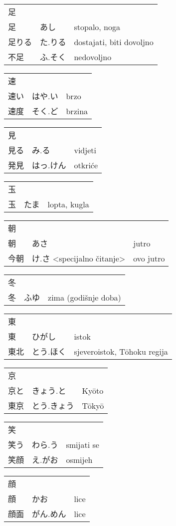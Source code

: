 

\newenvironment{dictentry}[1]{
	\begin{tabular}{p{2cm} p{3cm} p{10cm}}
		#1 &&\\
}{
	\end{tabular}
	\vspace{20pt}
}

\newcommand{\example}[3]{
	\hspace*{\fill}#1 & #2 & #3\\
}

\author{ロボット君}


\begin{dictentry}{足}
\example{足}{あし}{stopalo, noga}
\example{足りる}{た.りる}{dostajati, biti dovoljno}
\example{不足}{ふ.そく}{nedovoljno}
\end{dictentry}

\begin{dictentry}{速}
\example{速い}{はや.い}{brzo}
\example{速度}{そく.ど}{brzina}
\end{dictentry}

\begin{dictentry}{見}
\example{見る}{み.る}{vidjeti}
\example{発見}{はっ.けん}{otkriće}
\end{dictentry}

\begin{dictentry}{玉}
\example{玉}{たま}{lopta, kugla}
\end{dictentry}

\begin{dictentry}{朝}
\example{朝}{あさ}{jutro}
\example{今朝}{け.さ <specijalno čitanje>}{ovo jutro}
\end{dictentry}

\begin{dictentry}{冬}
\example{冬}{ふゆ}{zima (godišnje doba)}
\end{dictentry}

\begin{dictentry}{東}
\example{東}{ひがし}{istok}
\example{東北}{とう.ほく}{sjeveroistok, Tōhoku regija}
\end{dictentry}

\begin{dictentry}{京}
\example{京と}{きょう.と}{Kyōto}
\example{東京}{とう.きょう}{Tōkyō}
\end{dictentry}

\begin{dictentry}{笑}
\example{笑う}{わら.う}{smijati se}
\example{笑顔}{え.がお}{osmijeh}
\end{dictentry}

\begin{dictentry}{顔}
\example{顔}{かお}{lice}
\example{顔面}{がん.めん}{lice}
\end{dictentry}

